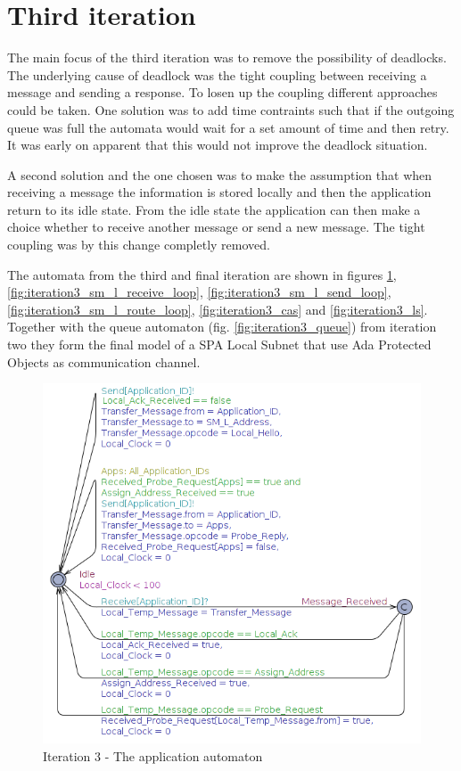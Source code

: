 \section{Third iteration}
The main focus of the third iteration was to remove the possibility of
deadlocks. The underlying cause of deadlock was the tight coupling between
receiving a message and sending a response. To losen up the coupling different
approaches could be taken. One solution was to add time contraints such that if
the outgoing queue was full the automata would wait for a set amount of time
and then retry. It was early on apparent that this would not improve the
deadlock situation.

A second solution and the one chosen was to make the assumption that when
receiving a message the information is stored locally and then the application
return to its idle state. From the idle state the application can then make a
choice whether to receive another message or send a new message. The tight
coupling was by this change completly removed.

The automata from the third and final iteration are shown in figures
\ref{fig:iteration3_app}, \ref{fig:iteration3_sm_l_receive_loop},
\ref{fig:iteration3_sm_l_send_loop}, \ref{fig:iteration3_sm_l_route_loop},
\ref{fig:iteration3_cas} and \ref{fig:iteration3_ls}. Together with the queue
automaton (fig. \ref{fig:iteration3_queue}) from iteration two they form the
final model of a SPA Local Subnet that use Ada Protected Objects as
communication channel.

\begin{figure}[ht]
    \centering
    \includegraphics[width=\textwidth]{figures/iteration3_app}
    \caption{Iteration 3 - The application automaton}
    \label{fig:iteration3_app}
\end{figure}

